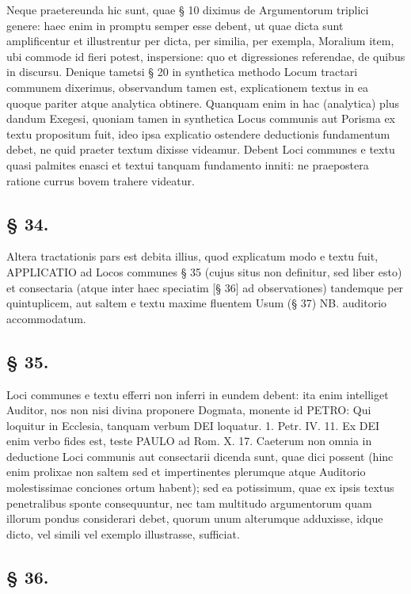 Neque praetereunda hic sunt, quae § 10 diximus de Argumentorum triplici genere: haec enim in promptu semper esse debent, ut quae dicta sunt amplificentur et
illustrentur per dicta, per similia, per exempla, Moralium item, ubi commode id fieri potest, inspersione: quo et digressiones referendae, de quibus in discursu. Denique tametsi § 20 in synthetica methodo Locum tractari communem dixerimus, observandum tamen est, explicationem textus in ea quoque pariter atque analytica obtinere. Quanquam enim in hac (analytica) plus dandum Exegesi, quoniam tamen in synthetica Locus communis aut Porisma ex textu propositum fuit, ideo ipsa explicatio ostendere deductionis fundamentum debet, ne quid praeter textum dixisse videamur. Debent Loci communes e textu quasi palmites enasci et textui tanquam fundamento inniti: ne praepostera ratione currus bovem trahere videatur.

\subsection*{§ 34.}

Altera tractationis pars est debita illius, quod explicatum modo e textu fuit, APPLICATIO ad Locos communes § 35 (cujus situs non definitur, sed liber esto) et consectaria (atque inter haec speciatim [§ 36] ad observationes) tandemque per quintuplicem, aut saltem e textu maxime fluentem Usum (§ 37) NB. auditorio accommodatum.

\subsection*{§ 35.}

Loci communes e textu efferri non inferri in eundem debent: ita enim intelliget Auditor, nos non nisi divina proponere Dogmata, monente id PETRO: Qui loquitur in Ecclesia, tanquam verbum DEI loquatur. 1. Petr. IV. 11. Ex DEI enim verbo fides est, teste PAULO ad Rom. X. 17. Caeterum non omnia in deductione Loci communis aut consectarii dicenda sunt, quae dici possent (hinc enim prolixae non saltem sed et
impertinentes plerumque atque Auditorio molestissimae conciones ortum habent); sed ea potissimum, quae ex ipsis textus penetralibus sponte consequuntur, nec tam multitudo argumentorum quam illorum pondus considerari debet, quorum unum alterumque adduxisse, idque dicto, vel simili vel exemplo illustrasse, sufficiat.

\subsection*{§ 36.}

